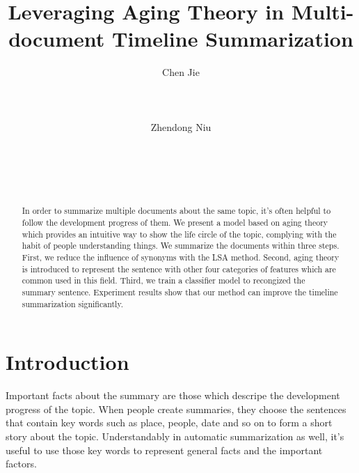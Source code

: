 \documentclass{acm_proc_article-sp}
\begin{document}
%
\title {Leveraging  Aging Theory in Multi-document Timeline Summarization} 

\author{
\alignauthor
Chen Jie\\
     \\
       \\
       \\
\alignauthor
Zhendong Niu\\
         \\
       \\
       \\
       \\
}
\maketitle
\begin{abstract}

In order to summarize multiple documents about the same topic, it's often helpful to follow the development progress of them.
We present a model based on aging theory which provides an intuitive way to show the life circle of the topic, complying with the habit of people understanding things.
We summarize the documents within three steps.
First, we reduce the influence of synonyms with the LSA method.
Second, aging theory is introduced to represent the sentence with other four categories of features which are common used in this field. 
Third, we train a classifier model to recongized the summary sentence. 
Experiment results show that our method can improve the timeline summarization significantly.

\end{abstract}

%
\section{Introduction}
%

Important facts about the summary are those which descripe the development progress of the topic.
When people create summaries, they choose the sentences that contain key words such as place, people, date and so on to form a short story about the topic.
Understandably in automatic summarization as well, it's useful to use those key words to represent general facts and the important factors.
\end{document}
